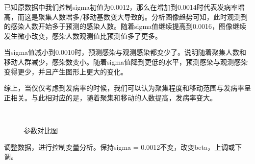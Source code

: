 \documentclass[withoutpreface,bwprint]{cumcmthesis} %
\begin{document}
已知原数据中我们控制sigma初值为0.0012，那么在增加到0.0014时代表发病率增高，而这是聚集人数增多/移动基数变大导致的。分析图像趋势可知，此时观测到的感染人数开始多于预测的感染人数。随着sigma值继续提高到0.0016，图像继续发⽣微小改变，感染人数观测值比预测值多了更多。

当sigma值减小到0.0010时，预测感染与观测感染都变少了。说明随着聚集人数和移动人群减少，感染数变小。随着sigma值降到更低的水平，预测感染与观测感染变得更少，并且产生图形上更⼤的变化。

综上，当仅仅考虑到发病率的时候，我们可以认为聚集程度和移动范围与发病率呈正相关。与此相对应的是，随着聚集和移动的人数提高，发病率变大。

\clearpage
\begin{figure}[!htb]
    \centering
    \hfill
     \\
    \hfill
    \caption{参数对比图}
\end{figure}
调整数据，进行控制变量分析。保持sigma = 0.0012不变，改变beta，上调或下调。
\end{document}
